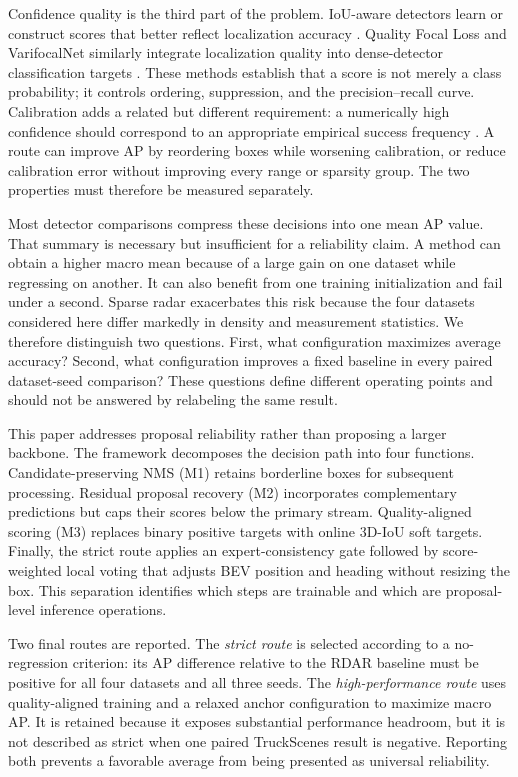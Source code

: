 \documentclass[preprint,12pt,times]{elsarticle}
\begin{document}
Confidence quality is the third part of the problem. IoU-aware detectors learn
or construct scores that better reflect localization accuracy
\cite{jiang2018iounet}. Quality Focal Loss and VarifocalNet similarly integrate
localization quality into dense-detector classification targets
\cite{li2022gfl,zhang2021varifocalnet}. These methods establish that a score is
not merely a class probability; it controls ordering, suppression, and the
precision--recall curve. Calibration adds a related but different requirement:
a numerically high confidence should correspond to an appropriate empirical
success frequency \cite{guo2017calibration}. A route can improve AP by
reordering boxes while worsening calibration, or reduce calibration error
without improving every range or sparsity group. The two properties must
therefore be measured separately.

Most detector comparisons compress these decisions into one mean AP value.
That summary is necessary but insufficient for a reliability claim. A method
can obtain a higher macro mean because of a large gain on one dataset while
regressing on another. It can also benefit from one training initialization
and fail under a second. Sparse radar exacerbates this risk because the four
datasets considered here differ markedly in density and measurement
statistics. We therefore distinguish two questions. First, what configuration
maximizes average accuracy? Second, what configuration improves a fixed
baseline in every paired dataset-seed comparison? These questions define
different operating points and should not be answered by relabeling the same
result.

This paper addresses proposal reliability rather than proposing a larger
backbone. The framework decomposes the decision path into four functions.
Candidate-preserving NMS (M1) retains borderline boxes for subsequent
processing. Residual proposal recovery (M2) incorporates complementary
predictions but caps their scores below the primary stream. Quality-aligned
scoring (M3) replaces binary positive targets with online 3D-IoU soft targets.
Finally, the strict route applies an expert-consistency gate followed by
score-weighted local voting that adjusts BEV position and heading without
resizing the box. This separation identifies which steps are trainable and
which are proposal-level inference operations.

Two final routes are reported. The \emph{strict route} is selected according
to a no-regression criterion: its AP difference relative to the RDAR baseline
must be positive for all four datasets and all three seeds. The
\emph{high-performance route} uses quality-aligned training and a relaxed
anchor configuration to maximize macro AP. It is retained because it exposes
substantial performance headroom, but it is not described as strict when one
paired TruckScenes result is negative. Reporting both prevents a favorable
average from being presented as universal reliability.
\end{document}
